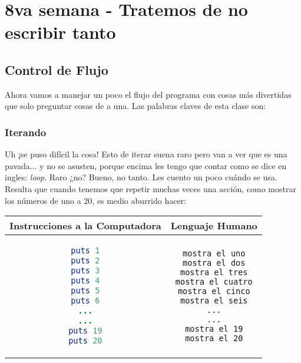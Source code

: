 \chapter{8va semana - Tratemos de no escribir tanto}

\section{Control de Flujo}
Ahora vamos a manejar un poco el flujo del programa con cosas más divertidas que solo preguntar cosas de a una. Las palabras claves de esta clase son:

\subsection{Iterando}
Uh ¡se puso difícil la cosa! Esto de iterar suena raro pero van a ver que es una pavada... y no se asusten, porque encima les tengo que contar como se dice en ingles: \emph{loop}. Raro ¿no? Bueno, no tanto. Les cuento un poco cuándo se usa.\\

Resulta que cuando tenemos que repetir muchas veces una acción, como mostrar los números de uno a 20, es medio aburrido hacer:

\begin{center}
\begin{tabular}{|c|c|}
\hline
\rowcolor[gray]{0.9}Instrucciones a la Computadora & Lenguaje Humano \\
\hline
\begin{lstlisting}[language=ruby]
puts 1
puts 2
puts 3
puts 4
puts 5
puts 6
...
...
puts 19
puts 20
\end{lstlisting} & \begin{lstlisting}
mostra el uno
mostra el dos
mostra el tres
mostra el cuatro
mostra el cinco
mostra el seis
...
...
mostra el 19
mostra el 20
\end{lstlisting} \\
\hline
\end{tabular}
\end{center}

